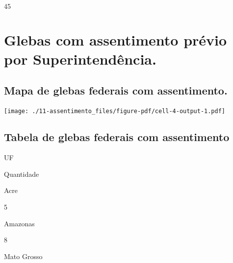 \documentclass[
  letterpaper,
]{report}
\begin{document}
\n      

45

\n    

\n  

\n

\hypertarget{glebas-com-assentimento-pruxe9vio-por-superintenduxeancia.}{%
\section{Glebas com assentimento prévio por
Superintendência.}\label{glebas-com-assentimento-pruxe9vio-por-superintenduxeancia.}}

\hypertarget{mapa-de-glebas-federais-com-assentimento.}{%
\subsection{Mapa de glebas federais com
assentimento.}\label{mapa-de-glebas-federais-com-assentimento.}}

\texttt{[image: ./11-assentimento\_files/figure-pdf/cell-4-output-1.pdf]}

\hypertarget{tabela-de-glebas-federais-com-assentimento}{%
\subsection{Tabela de glebas federais com
assentimento}\label{tabela-de-glebas-federais-com-assentimento}}

\n  

\n    

\n      

UF

\n      

Quantidade

\n    

\n  

\n  

\n    

\n      

Acre

\n      

5

\n    

\n    

\n      

Amazonas

\n      

8

\n    

\n    

\n      

Mato Grosso
\end{document}
